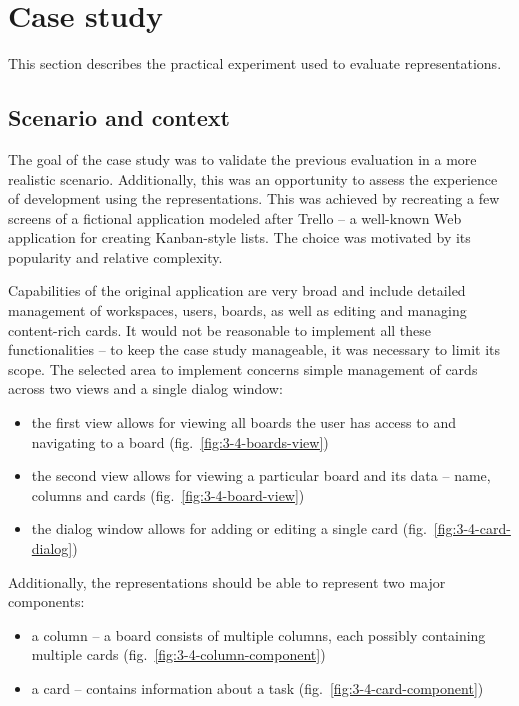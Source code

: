 \section{Case study}\label{sec:case-study}
This section describes the practical experiment used to evaluate representations.

\subsection{Scenario and context}\label{subsec:scenario-and-context}
The goal of the case study was to validate the previous evaluation in a more realistic scenario.
Additionally, this was an opportunity to assess the experience of development using the representations.
This was achieved by recreating a few screens of a fictional application modeled after Trello -- a well-known Web application for creating Kanban-style lists.
The choice was motivated by its popularity and relative complexity.

Capabilities of the original application are very broad and include detailed management of workspaces, users, boards, as well as editing and managing content-rich cards.
It would not be reasonable to implement all these functionalities -- to keep the case study manageable, it was necessary to limit its scope.
The selected area to implement concerns simple management of cards across two views and a single dialog window:
\begin{itemize}
    \item the first view allows for viewing all boards the user has access to and navigating to a board (fig.~\ref{fig:3-4-boards-view})
    \item the second view allows for viewing a particular board and its data -- name, columns and cards (fig.~\ref{fig:3-4-board-view})
    \item the dialog window allows for adding or editing a single card (fig.~\ref{fig:3-4-card-dialog})
\end{itemize}
Additionally, the representations should be able to represent two major components:
\begin{itemize}
    \item a column -- a board consists of multiple columns, each possibly containing multiple cards (fig.~\ref{fig:3-4-column-component})
    \item a card -- contains information about a task (fig.~\ref{fig:3-4-card-component})
\end{itemize}

